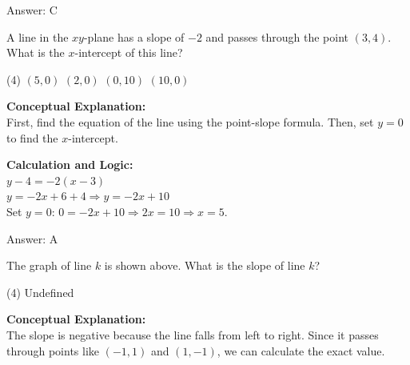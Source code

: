 \documentclass[11pt,paper=a4,answers]{exam}
\begin{document}
\begin{questions}
\begin{solution}
\vspace{15pt}
Answer: \colorbox{yellow!100}{C}
\end{solution}

\vspace{20pt}

\question
A line in the $xy$-plane has a slope of $-2$ and passes through the point $(3, 4)$. What is the $x$-intercept of this line?
\begin{tasks}(4)
    \task $(5, 0)$
    \task $(2, 0)$
    \task $(0, 10)$
    \task $(10, 0)$
\end{tasks}

\begin{solution}
\textbf{Conceptual Explanation:} \\
First, find the equation of the line using the point-slope formula. Then, set $y=0$ to find the $x$-intercept.

\vspace{10pt}
\textbf{Calculation and Logic:} \\
$y - 4 = -2(x - 3)$ \\
$y = -2x + 6 + 4 \Rightarrow y = -2x + 10$ \\
Set $y = 0$: $0 = -2x + 10 \Rightarrow 2x = 10 \Rightarrow x = 5$.

\vspace{15pt}
Answer: \colorbox{yellow!100}{A}
\end{solution}

\vspace{20pt}

\question

The graph of line $k$ is shown above. What is the slope of line $k$?
\begin{tasks}(4)
    \task Undefined
\end{tasks}
\begin{center}
\end{center}
\begin{solution}
\textbf{Conceptual Explanation:} \\
The slope is negative because the line falls from left to right. Since it passes through points like $(-1, 1)$ and $(1, -1)$, we can calculate the exact value.


\end{solution}
\end{questions}
\end{document}
